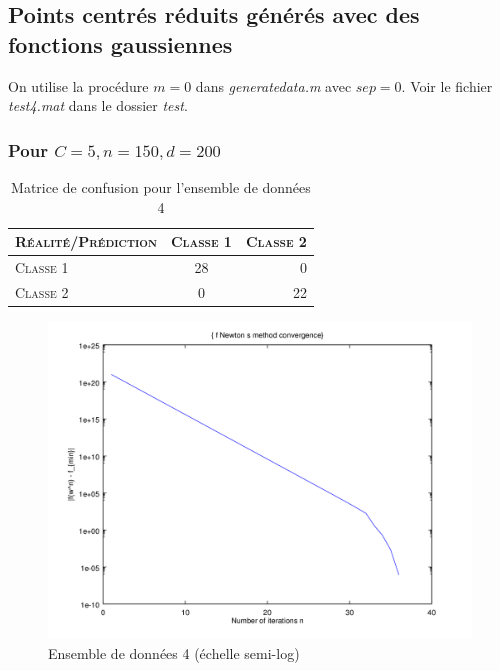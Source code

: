 \documentclass{article}
\begin{document}
\subsection{Points centrés réduits générés avec des fonctions gaussiennes}

On utilise la procédure $m=0$ dans \emph{generatedata.m} avec $sep=0$. Voir le fichier \emph{test4.mat} dans le dossier \emph{test}. 

\subsubsection{Pour $C=5, n=150, d=200$}

     \begin{table}[H]
       \caption{Matrice de confusion pour l'ensemble de données 4}
       \begin{tabular}{|l|c|r|}
         \hline
         \textsc{Réalité/Prédiction} & \textsc{Classe 1} & \textsc{Classe 2}\\
         \hline
         \textsc{Classe 1} & 28 & 0\\
         \hline
         \textsc{Classe 2} & 0 & 22\\
         \hline
       \end{tabular}
     \end{table}

         \begin{figure}[H]
           \begin{center}
             \includegraphics[scale=0.5]{images/cvnewton4.png}
             \caption{Ensemble de données 4 (échelle semi-log)}
           \end{center}
         \end{figure}
\end{document}
